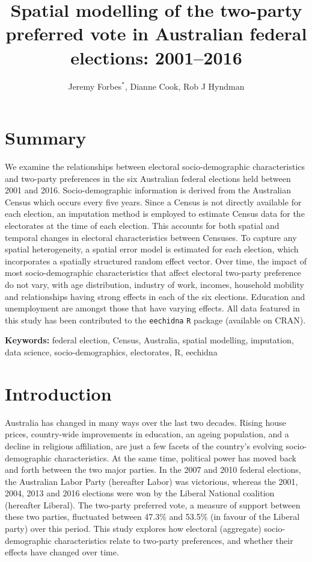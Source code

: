 \documentclass[times, doublespace]{anzsauth}
\title{Spatial modelling of the two-party preferred vote in Australian federal elections: 2001--2016}
\author{Jeremy Forbes\(^*\), Dianne Cook, Rob J Hyndman}
\date{}
\let\oldmaketitle\maketitle
\def\maketitle{\cleanlookdateon\oldmaketitle}
\begin{document}
\maketitle

\hypertarget{summary}{%
\section*{Summary}\label{summary}}

We examine the relationships between electoral socio-demographic characteristics and two-party preferences in the six Australian federal elections held between 2001 and 2016. Socio-demographic information is derived from the Australian Census which occurs every five years. Since a Census is not directly available for each election, an imputation method is employed to estimate Census data for the electorates at the time of each election. This accounts for both spatial and temporal changes in electoral characteristics between Censuses. To capture any spatial heterogeneity, a spatial error model is estimated for each election, which incorporates a spatially structured random effect vector. Over time, the impact of most socio-demographic characteristics that affect electoral two-party preference do not vary, with age distribution, industry of work, incomes, household mobility and relationships having strong effects in each of the six elections. Education and unemployment are amongst those that have varying effects. All data featured in this study has been contributed to the \texttt{eechidna} \texttt{R} package (available on CRAN).

\textbf{Keywords:} federal election, Census, Australia, spatial modelling, imputation, data science, socio-demographics, electorates, R, eechidna

\hypertarget{intro}{%
\section{Introduction}\label{intro}}

Australia has changed in many ways over the last two decades. Rising house prices, country-wide improvements in education, an ageing population, and a decline in religious affiliation, are just a few facets of the country's evolving socio-demographic characteristics. At the same time, political power has moved back and forth between the two major parties. In the 2007 and 2010 federal elections, the Australian Labor Party (hereafter Labor) was victorious, whereas the 2001, 2004, 2013 and 2016 elections were won by the Liberal National coalition (hereafter Liberal). The two-party preferred vote, a measure of support between these two parties, fluctuated between 47.3\% and 53.5\% (in favour of the Liberal party) over this period. This study explores how electoral (aggregate) socio-demographic characteristics relate to two-party preferences, and whether their effects have changed over time.
\end{document}
